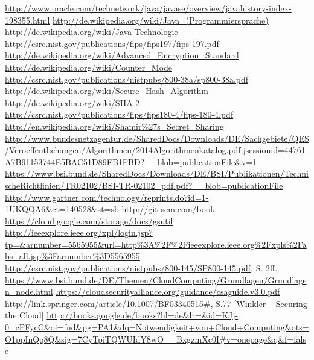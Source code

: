 \documentclass[12pt,a4paper,bibliography=totocnumbered,listof=totocnumbered]{scrartcl}
\begin{document}
	
 
 \begin{thebibliography}{xxxxxxxxxxxxxxxxxxx}
	\url{http://www.oracle.com/technetwork/java/javase/overview/javahistory-index-198355.html}
	\url{http://de.wikipedia.org/wiki/Java_(Programmiersprache)}
	\url{ http://de.wikipedia.org/wiki/Java-Technologie}
	\url{http://csrc.nist.gov/publications/fips/fips197/fips-197.pdf}
	\url{http://de.wikipedia.org/wiki/Advanced_Encryption_Standard}
	\url{http://de.wikipedia.org/wiki/Counter_Mode}
	\url{http://csrc.nist.gov/publications/nistpubs/800-38a/sp800-38a.pdf}
	\url{http://de.wikipedia.org/wiki/Secure_Hash_Algorithm}
	\url{http://de.wikipedia.org/wiki/SHA-2}
	\url{http://csrc.nist.gov/publications/fips/fips180-4/fips-180-4.pdf}
	\url{http://en.wikipedia.org/wiki/Shamir%27s_Secret_Sharing}
	\url{http://www.bundesnetzagentur.de/SharedDocs/Downloads/DE/Sachgebiete/QES/Veroeffentlichungen/Algorithmen/2014Algorithmenkatalog.pdf;jsessionid=44761A7B91153744E5BAC51D89FB1FBD?__blob=publicationFile&v=1}
	\url{https://www.bsi.bund.de/SharedDocs/Downloads/DE/BSI/Publikationen/TechnischeRichtlinien/TR02102/BSI-TR-02102_pdf.pdf?__blob=publicationFile}
	\url{http://www.gartner.com/technology/reprints.do?id=1-1UKQQA6&ct=140528&st=sb}
 	\url{http://git-scm.com/book}
	\url{https://cloud.google.com/storage/docs/gsutil}	
	\url{http://ieeexplore.ieee.org/xpl/login.jsp?tp=&arnumber=5565955&url=http%3A%2F%2Fieeexplore.ieee.org%2Fxpls%2Fabs_all.jsp%3Farnumber%3D5565955}
	\url{http://csrc.nist.gov/publications/nistpubs/800-145/SP800-145.pdf}, S. 2ff.
	\url{https://www.bsi.bund.de/DE/Themen/CloudComputing/Grundlagen/Grundlagen_node.html}
	\url{https://cloudsecurityalliance.org/guidance/csaguide.v3.0.pdf}
	\url{http://link.springer.com/article/10.1007/BF03340515#},  S.77
	 [Winkler – Securing the Cloud]
	 \url{http://books.google.de/books?hl=de&lr=&id=KJj-0_cPFycC&oi=fnd&pg=PA1&dq=Notwendigkeit+von+Cloud+Computing&ots=O1ppInQq8Q&sig=7CyTpiTQWUIdY8wO__BxgzmXc0I#v=onepage&q&f=false}
	
\end{thebibliography}
\pagebreak
\end{document}
